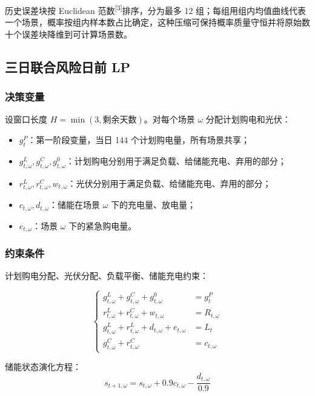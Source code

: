 \documentclass[withoutpreface,bwprint]{cumcmthesis} %
\begin{document}
历史误差块按 Euclidean 范数\textsuperscript{[3]}排序，分为最多 12 组；每组用组内均值曲线代表一个场景，概率按组内样本数占比确定，这种压缩可保持概率质量守恒并将原始数十个误差块降维到可计算场景数。

\subsection{三日联合风险日前 LP}

\subsubsection{决策变量}

设窗口长度 $H=\min(3, \text{剩余天数})$。对每个场景 $\omega$ 分配计划购电和光伏：
\begin{itemize}
    \item $g^P_t$：第一阶段变量，当日 144 个计划购电量，所有场景共享；
    \item $g^L_{t,\omega}, g^C_{t,\omega}, g^0_{t,\omega}$：计划购电分别用于满足负载、给储能充电、弃用的部分；
    \item $r^L_{t,\omega}, r^C_{t,\omega}, w_{t,\omega}$：光伏分别用于满足负载、给储能充电、弃用的部分；
    \item $c_{t,\omega}, d_{t,\omega}$：储能在场景 $\omega$ 下的充电量、放电量；
    \item $e_{t,\omega}$：场景 $\omega$ 下的紧急购电量。
\end{itemize}

\subsubsection{约束条件}

计划购电分配、光伏分配、负载平衡、储能充电约束：

\begin{equation}
	\left\{
	\begin{aligned}
    g^L_{t,\omega}+g^C_{t,\omega}+g^0_{t,\omega} &= g^P_t\\
    r^L_{t,\omega}+r^C_{t,\omega}+w_{t,\omega} &= R_{t,\omega}\\
    g^L_{t,\omega}+r^L_{t,\omega}+d_{t,\omega}+e_{t,\omega} &= L_t\\
    g^C_{t,\omega}+r^C_{t,\omega} &= c_{t,\omega}
	\end{aligned}
	\right.
\end{equation}
\vspace{5pt}

储能状态演化方程：
\begin{equation}
    s_{t+1,\omega} = s_{t,\omega} + 0.9 c_{t,\omega} - \frac{d_{t,\omega}}{0.9}
    \label{eq:q2-soc}
\end{equation}
\end{document}
